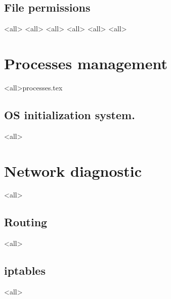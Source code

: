 \subsection{File permissions}
\mode<all>{}
\mode<all>{}
\mode<all>{}
\mode<all>{}
\mode<all>{}
\mode<all>{}
\section{Processes management}
\mode<all>{{processes.tex}}
\subsection{OS initialization system.}
\mode<all>{}



\section{Network diagnostic}
\mode<all>{}
\subsection{Routing}
\mode<all>{}
\subsection{iptables}
\mode<all>{}


